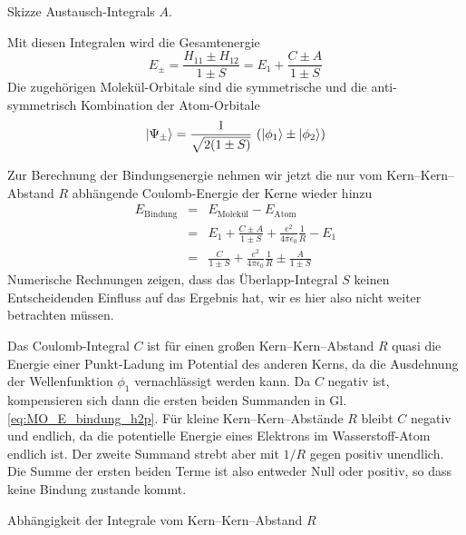 \begin{marginfigure}

\caption{Skizze Austausch-Integrals $A$.}
\end{marginfigure}


Mit diesen Integralen wird die Gesamtenergie
\begin{equation}
E_\pm = \frac{H_{11} \pm H_{12}}{1 \pm S} = E_1 + \frac{C \pm A}{1 \pm S}
\end{equation}
Die zugehörigen Molekül-Orbitale sind die symmetrische und die anti-symmetrisch Kombination der Atom-Orbitale
\begin{equation}
\ket{\Psi_\pm }= \frac{1}{\sqrt{2 (1 \pm  S)}} \, \left( \ket{\phi_1} \pm \ket{\phi_2} \right)
\end{equation}

Zur Berechnung der Bindungsenergie nehmen wir jetzt die nur vom Kern--Kern--Abstand $R$ abhängende Coulomb-Energie der Kerne wieder hinzu
\begin{eqnarray}
 E_\text{Bindung} &=&  E_\text{Molekül} -  E_\text{Atom} \\
  &=&   E_1 + \frac{C \pm A}{1 \pm S} + \frac{e^2}{4 \pi \epsilon_0} \frac{1}{R} - E_1 \\
   &=&\frac{C }{1 \pm S}  + \frac{e^2}{4 \pi \epsilon_0} \frac{1}{R}  \pm \frac{ A}{1 \pm S}  \label{eq:MO_E_bindung_h2p}
\end{eqnarray}
Numerische Rechnungen zeigen, dass das Überlapp-Integral $S$ keinen Entscheidenden Einfluss auf das Ergebnis hat, wir es hier also nicht weiter betrachten müssen.

Das Coulomb-Integral $C$ ist für einen  großen Kern--Kern--Abstand $R$ quasi die Energie einer Punkt-Ladung im Potential des anderen Kerns, da die Ausdehnung der Wellenfunktion $\phi_1$ vernachlässigt werden kann. Da $C$ negativ ist, kompensieren sich dann die ersten beiden Summanden in Gl. \ref{eq:MO_E_bindung_h2p}. Für kleine Kern--Kern--Abstände $R$ bleibt $C$ negativ und endlich, da die potentielle Energie eines Elektrons im Wasserstoff-Atom endlich ist. Der zweite Summand strebt aber mit $1/R$ gegen positiv unendlich. Die Summe der ersten beiden Terme ist also entweder Null oder positiv, so dass keine Bindung zustande kommt.



\begin{marginfigure}

\caption{Abhängigkeit der Integrale vom Kern--Kern--Abstand $R$ }
\end{marginfigure}



